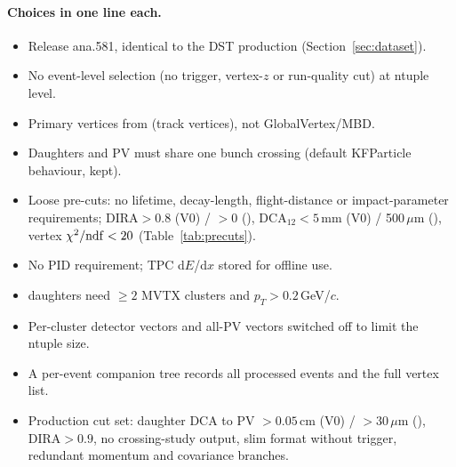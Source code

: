 \paragraph{Choices in one line each.}
\begin{itemize}\setlength\itemsep{1pt}
\item Release ana.581, identical to the DST production (Section~\ref{sec:dataset}).
\item No event-level selection (no trigger, vertex-$z$ or run-quality cut) at ntuple level.
\item Primary vertices from  (track vertices), not GlobalVertex/MBD.
\item Daughters and PV must share one bunch crossing (default KFParticle behaviour, kept).
\item Loose pre-cuts: no lifetime, decay-length, flight-distance or impact-parameter
  requirements; DIRA$>0.8$ (V0) / $>0$ (\Dzero), DCA$_{12}<5$\,mm (V0) / 500\,$\mu$m (\Dzero),
  vertex $\chi^2/{\rm ndf}<20$ (Table~\ref{tab:precuts}).
\item No PID requirement; TPC d$E$/d$x$ stored for offline use.
\item \Dzero{} daughters need $\geq2$ MVTX clusters and $p_T>0.2$\,GeV/$c$.
\item Per-cluster detector vectors and all-PV vectors switched off to limit the ntuple size.
\item A per-event companion tree records all processed events and the full vertex list.
\item Production cut set: daughter DCA to PV $>0.05$\,cm (V0) / $>30\,\mu$m (\Dzero), DIRA$>0.9$, no
  crossing-study output, slim format without trigger, redundant momentum and covariance branches.
\end{itemize}
